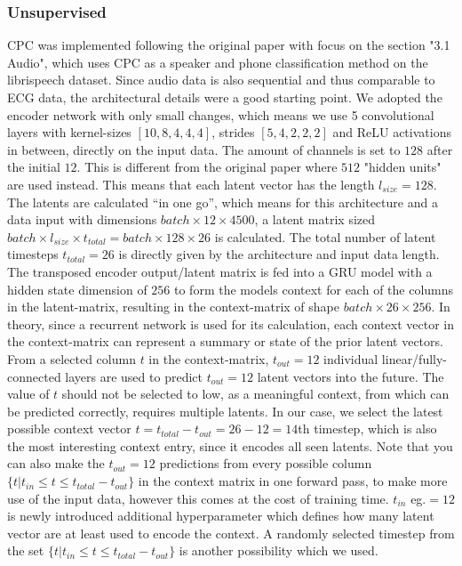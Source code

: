\subsubsection{Unsupervised}\label{sec:cpc-unsupervised}
CPC was implemented following the original paper \autocite{DBLP:journals/corr/abs-1807-03748} with focus on the section "3.1 Audio", which uses CPC as a speaker and phone classification method on the librispeech dataset. Since audio data is also sequential and thus comparable to ECG data, the architectural details were a good starting point. We adopted the encoder network with only small changes, which means we use 5 convolutional layers with kernel-sizes $[10, 8, 4, 4, 4]$, strides $[5, 4, 2, 2, 2]$ and ReLU activations in between, directly on the input data. The amount of channels is set to $128$ after the initial $12$. This is different from the original paper \autocite{DBLP:journals/corr/abs-1807-03748} where $512$ "hidden units" are used instead. This means that each latent vector has the length $l_{size}=128$. The latents are calculated \enquote{in one go}, which means for this architecture and a data input with dimensions $\mathit{batch} \times 12 \times 4500$, a latent matrix sized $\mathit{batch} \times l_{size} \times t_{total} = \mathit{batch} \times 128 \times 26$ is calculated. The total number of latent timesteps $t_{total}=26$ is directly given by the architecture and input data length. The transposed encoder output/latent matrix is fed into a GRU model with a hidden state dimension of $256$ to form the models context for each of the columns in the latent-matrix, resulting in the context-matrix of shape $\mathit{batch} \times 26 \times 256$. In theory, since a recurrent network is used for its calculation, each context vector in the context-matrix can represent a summary or state of the prior latent vectors. From a selected column $t$ in the context-matrix, $t_{out}=12$ individual linear/fully-connected layers are used to predict $t_{out}=12$ latent vectors into the future. The value of $t$ should not be selected to low, as a meaningful context, from which can be predicted correctly, requires multiple latents. In our case, we select the latest possible context vector $t=t_{total}-t_{out}=26-12=14$th timestep, which is also the most interesting context entry, since it encodes all seen latents. Note that you can also make the $t_{out}=12$ predictions from every possible column $\{t | t_{in}\leq t \leq t_{total}-t_{out}\}$ in the context matrix in one forward pass, to make more use of the input data, however this comes at the cost of training time. $t_{in}$ eg.$=12$ is newly introduced additional hyperparameter which defines how many latent vector are at least used to encode the context. A randomly selected timestep from the set $\{t | t_{in}\leq t \leq t_{total}-t_{out}\}$ is another possibility which we used. 

